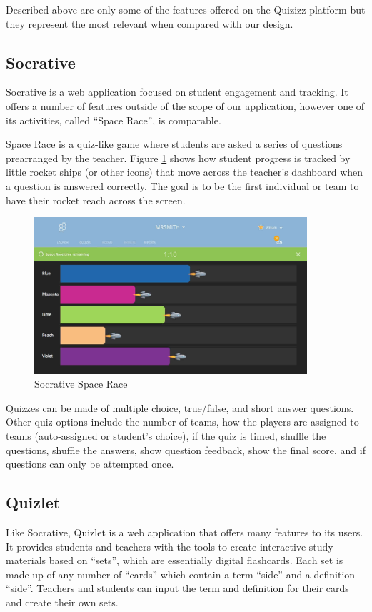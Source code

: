 \documentclass{article}
\begin{document}
Described above are only some of the features offered on the Quizizz platform but they represent the most relevant when compared with our design.

\subsection{Socrative}
Socrative is a web application focused on student engagement and tracking. It offers a number of features outside of the scope of our application, however one of its activities, called ``Space Race'', is comparable.
\smallskip

Space Race is a quiz-like game where students are asked a series of questions prearranged by the teacher. Figure \ref{fig:socrative-space-race} shows how student progress is tracked by little rocket ships (or other icons) that move across the teacher's dashboard when a question is answered correctly. The goal is to be the first individual or team to have their rocket reach across the screen.
\smallskip

\begin{figure}
    \centering
    \includegraphics[width=0.9\textwidth]{images/socrative-space_race.jpg}
    \caption{Socrative Space Race \cite{socrative}}
    \label{fig:socrative-space-race}
\end{figure}

Quizzes can be made of multiple choice, true/false, and short answer questions. Other quiz options include the number of teams, how the players are assigned to teams (auto-assigned or student's choice), if the quiz is timed, shuffle the questions, shuffle the answers, show question feedback, show the final score, and if questions can only be attempted once.

\subsection{Quizlet}
Like Socrative, Quizlet is a web application that offers many features to its users. It provides students and teachers with the tools to create interactive study materials based on ``sets'', which are essentially digital flashcards. Each set is made up of any number of ``cards'' which contain a term ``side'' and a definition ``side''. Teachers and students can input the term and definition for their cards and create their own sets.
\smallskip
\end{document}
